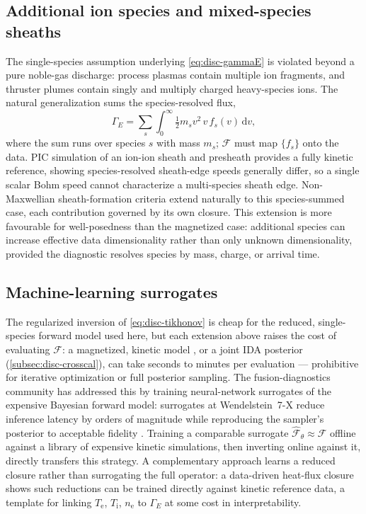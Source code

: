 \subsection{Additional ion species and mixed-species sheaths}
\label{subsec:disc-species}

The single-species assumption underlying \cref{eq:disc-gammaE} is violated beyond a pure noble-gas discharge: process plasmas contain multiple ion fragments, and thruster plumes contain singly and multiply charged heavy-species ions. The natural generalization sums the species-resolved flux,
\begin{equation}
\Gamma_{E} = \sum_{s} \int_{0}^{\infty} \tfrac{1}{2} m_{s} v^{2} \, v \, f_{s}(v) \, \mathrm{d}v ,
\label{eq:disc-gammaE-multi}
\end{equation}
where the sum runs over species $s$ with mass $m_{s}$; $\mathcal{F}$ must map $\{f_{s}\}$ onto the data. PIC simulation of an ion-ion sheath and presheath \cite{ref0655} provides a fully kinetic reference, showing species-resolved sheath-edge speeds generally differ, so a single scalar Bohm speed cannot characterize a multi-species sheath edge. Non-Maxwellian sheath-formation criteria \cite{ref0090} extend naturally to this species-summed case, each contribution governed by its own closure. This extension is more favourable for well-posedness than the magnetized case: additional species can increase effective data dimensionality rather than only unknown dimensionality, provided the diagnostic resolves species by mass, charge, or arrival time.

\subsection{Machine-learning surrogates}
\label{subsec:disc-ml}

The regularized inversion of \cref{eq:disc-tikhonov} is cheap for the reduced, single-species forward model used here, but each extension above raises the cost of evaluating $\mathcal{F}$: a magnetized, kinetic model \cite{ref0633}, or a joint IDA posterior (\cref{subsec:disc-crosscal}), can take seconds to minutes per evaluation — prohibitive for iterative optimization or full posterior sampling. The fusion-diagnostics community has addressed this by training neural-network surrogates of the expensive Bayesian forward model: surrogates at Wendelstein~7-X reduce inference latency by orders of magnitude while reproducing the sampler's posterior to acceptable fidelity \cite{ref0728}. Training a comparable surrogate $\hat{\mathcal{F}}_{\theta} \approx \mathcal{F}$ offline against a library of expensive kinetic simulations, then inverting online against it, directly transfers this strategy. A complementary approach learns a reduced closure rather than surrogating the full operator: a data-driven heat-flux closure \cite{ref0101} shows such reductions can be trained directly against kinetic reference data, a template for linking $T_{\mathrm{e}}$, $T_{\mathrm{i}}$, $n_{\mathrm{e}}$ to $\Gamma_{E}$ at some cost in interpretability.

